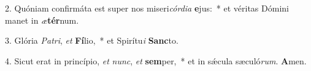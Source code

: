 2. Quóniam confirmáta est super nos miseri\textit{cór}\textit{di}\textit{a} \textbf{e}jus:~*  et véritas Dómini manet in \textit{æ}\textbf{tér}num.\

3. Glória \textit{Pa}\textit{tri}, \textit{et} \textbf{Fí}lio,~*  et Spirítu\textit{i} \textbf{Sanc}to.\

4. Sicut erat in princípio, \textit{et} \textit{nunc}, \textit{et} \textbf{sem}per,~*  et in sǽcula sæculó\textit{rum}. \textbf{A}men.\

